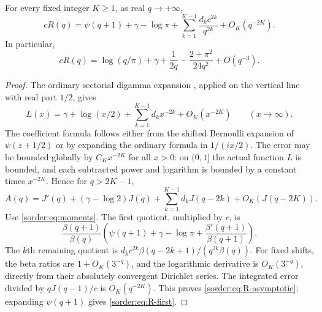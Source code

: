 \begin{lemma}\label{sorder:lem:R-asymptotic}
For every fixed integer $K\ge1$, as real $q\to+\infty$,
\begin{equation}\label{sorder:eq:R-asymptotic}
 cR(q)=\psi(q+1)+\gamma-\log\pi
       +\sum_{k=1}^{K-1}\frac{d_kc^{2k}}{q^{\underline{2k}}}
       +O_K(q^{-2K}).
\end{equation}
In particular,
\begin{equation}\label{sorder:eq:R-first}
 cR(q)=\log(q/\pi)+\gamma+\frac1{2q}
                  -\frac{2+\pi^2}{24q^2}+O(q^{-3}).
\end{equation}
\end{lemma}
\begin{proof}
The ordinary sectorial digamma expansion \cite[\S5.11]{DLMF}, applied on the vertical
line with real part $1/2$, gives
\[
 L(x)=\gamma+\log(x/2)+\sum_{k=1}^{K-1}d_kx^{-2k}
                     +O_K(x^{-2K})\qquad(x\to\infty).
\]
The coefficient formula follows either from the shifted Bernoulli
expansion of $\psi(z+1/2)$ or by expanding the ordinary formula in
$1/(ix/2)$. The error may be bounded globally by $C_Kx^{-2K}$ for
all $x>0$: on $(0,1]$ the actual function $L$ is bounded, and each
subtracted power and logarithm is bounded by a constant times
$x^{-2K}$. Hence for $q>2K-1$,
\[
 A(q)=J'(q)+(\gamma-\log2)J(q)
       +\sum_{k=1}^{K-1}d_kJ(q-2k)+O_K(J(q-2K)).
\]
Use \eqref{sorder:eq:moments}. The first quotient, multiplied by $c$,
is
\[
 \frac{\beta(q+1)}{\beta(q)}
 \left(\psi(q+1)+\gamma-\log\pi+
                         \frac{\beta'(q+1)}{\beta(q+1)}\right).
\]
The $k$th remaining quotient is
$d_kc^{2k}\beta(q-2k+1)/(q^{\underline{2k}}\beta(q))$.
For fixed shifts, the beta ratios are $1+O_K(3^{-q})$, and the
logarithmic derivative is $O_K(3^{-q})$, directly from their
absolutely convergent Dirichlet series. The integrated error divided
by $qJ(q-1)/c$ is $O_K(q^{-2K})$. This proves
\eqref{sorder:eq:R-asymptotic}; expanding $\psi(q+1)$ gives
\eqref{sorder:eq:R-first}.
\end{proof}

